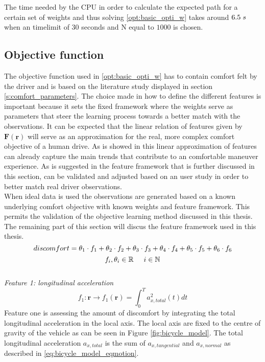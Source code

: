 The time needed by the CPU in order to calculate the expected path for a certain set of weights and thus solving \ref{opt:basic_opti_w} takes around $6.5\hspace{1mm}s$ when an timelimit of $30$ seconds and N equal to $1000$ is chosen. 


\subsection{Objective function}\label{s:obj}
The objective function used in \ref{opt:basic_opti_w} has to contain comfort felt by the driver and is based on the literature study displayed in section \ref{s:comfort_parameters}. The choice made in how to define the different features is important because it sets the fixed framework where the weights serve as parameters that steer the learning process towards a better match with the observations. It can be expected that the linear relation of features given by $\bm{F}(\bm{r})$ will serve as an approximation for the real, more complex comfort objective of a human drive. As is showed in \cite{Kuderer2015a} this linear approximation of features can already capture  the main trends that contribute to an comfortable maneuver experience. As is suggested in \cite{Kuderer2015a} the feature framework that is further discussed in this section, can be validated and adjusted based on an user study in order to better match real driver observations. \\

When ideal data is used the observations are generated based on a known underlying comfort objective with known weights and feature framework. This permits the validation of the objective learning method discussed in this thesis. The remaining part of this section will discus the feature framework used in this thesis.\\


\begin{equation}\label{eq:obj}
discomfort = \theta_1 \cdot f_1 +\theta_2 \cdot f_2 +\theta_3 \cdot f_3 +\theta_4 \cdot f_4 +\theta_5 \cdot f_5 +\theta_6 \cdot f_6 \\
\end{equation}
\[	f_i, \theta_i \in \mathbb{R} \hspace{5mm}
i \in \mathbb{N}\]\\


\textit{Feature 1: longitudinal acceleration}
\begin{equation}\label{eq:flong_acc}
f_{1}:\bm{r}\xrightarrow{}f_1(\bm{r})=\int_{0}^{T}a_{x,total}^{2}(t) dt
\end{equation}
Feature one is assessing the amount of discomfort by integrating the total longitudinal acceleration in the local axis. The local axis are fixed to the centre of gravity of the vehicle as can be seen in Figure \ref{fig:bicycle_model}. The total longitudinal acceleration  $a_{x,total} $ is the sum of  $ a_{x,tangential}$ and $a_{x,normal}$ as described in \ref{eq:bicycle_model_eqmotion}. \\

